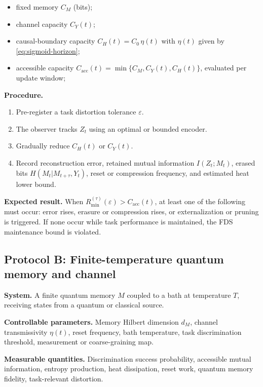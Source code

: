\documentclass[10pt,a4paper,twocolumn,aps,prl]{revtex4-2}
\begin{document}
\begin{itemize}
    \item fixed memory $C_M$ (bits);
    \item channel capacity $C_Y(t)$;
    \item causal-boundary capacity $C_H(t)=C_0\,\eta(t)$ with $\eta(t)$ given by \eqref{eq:sigmoid-horizon};
    \item {\raggedright accessible capacity $C_{\mathrm{acc}}(t)=\min\{C_M,C_Y(t),C_H(t)\}$, evaluated per update window;\par}
\end{itemize}

\textbf{Procedure.}
\begin{enumerate}
    \item Pre-register a task distortion tolerance $\varepsilon$.
    \item The observer tracks $Z_t$ using an optimal or bounded encoder.
    \item Gradually reduce $C_H(t)$ or $C_Y(t)$.
    \item Record reconstruction error, retained mutual information $I(Z_t;M_t)$, erased bits $H(M_t|M_{t+\tau},Y_t)$, reset or compression frequency, and estimated heat lower bound.
\end{enumerate}

\textbf{Expected result.} When $R_{\min}^{(\tau)}(\varepsilon)>C_{\mathrm{acc}}(t)$, at least one of the following must occur: error rises, erasure or compression rises, or externalization or pruning is triggered. If none occur while task performance is maintained, the FDS maintenance bound is violated.

\subsection{Protocol B: Finite-temperature quantum memory and channel}

\textbf{System.} A finite quantum memory $M$ coupled to a bath at temperature $T$, receiving states from a quantum or classical source.

\textbf{Controllable parameters.} Memory Hilbert dimension $d_M$, channel transmissivity $\eta(t)$, reset frequency, bath temperature, task discrimination threshold, measurement or coarse-graining map.

\textbf{Measurable quantities.} Discrimination success probability, accessible mutual information, entropy production, heat dissipation, reset work, quantum memory fidelity, task-relevant distortion.
\end{document}
